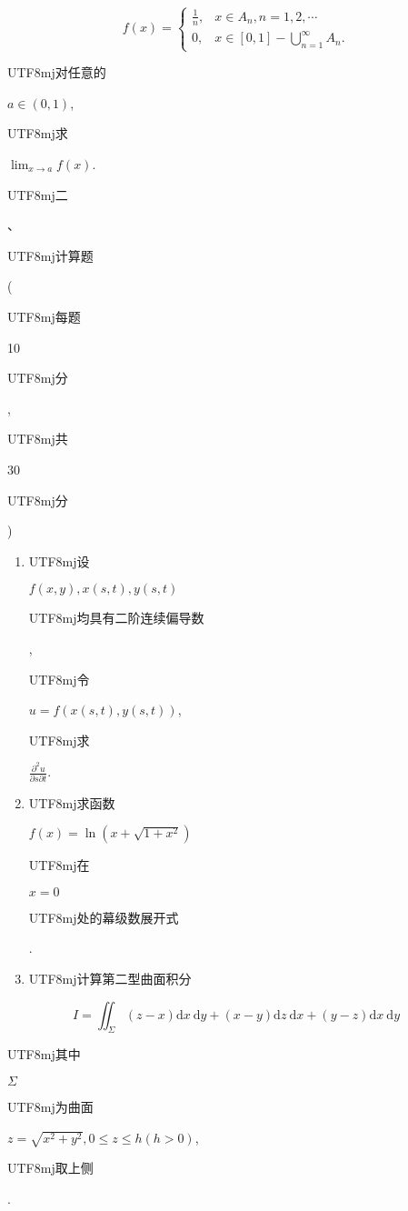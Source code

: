 \documentclass[10pt]{article}
\begin{document}
$$
f(x)= \begin{cases}\frac{1}{n}, & x \in A_{n}, n=1,2, \cdots \\ 0, & x \in[0,1]-\bigcup_{n=1}^{\infty} A_{n} .\end{cases}
$$
\begin{CJK}{UTF8}{mj}对任意的\end{CJK} $a \in(0,1)$, \begin{CJK}{UTF8}{mj}求\end{CJK} $\lim _{x \rightarrow a} f(x)$.

\begin{CJK}{UTF8}{mj}二\end{CJK}、\begin{CJK}{UTF8}{mj}计算题\end{CJK} (\begin{CJK}{UTF8}{mj}每题\end{CJK} 10 \begin{CJK}{UTF8}{mj}分\end{CJK}, \begin{CJK}{UTF8}{mj}共\end{CJK} 30 \begin{CJK}{UTF8}{mj}分\end{CJK})

\begin{enumerate}
  \item \begin{CJK}{UTF8}{mj}设\end{CJK} $f(x, y), x(s, t), y(s, t)$ \begin{CJK}{UTF8}{mj}均具有二阶连续偏导数\end{CJK}, \begin{CJK}{UTF8}{mj}令\end{CJK} $u=f(x(s, t), y(s, t))$, \begin{CJK}{UTF8}{mj}求\end{CJK} $\frac{\partial^{2} u}{\partial s \partial t}$.

  \item \begin{CJK}{UTF8}{mj}求函数\end{CJK} $f(x)=\ln \left(x+\sqrt{1+x^{2}}\right)$ \begin{CJK}{UTF8}{mj}在\end{CJK} $x=0$ \begin{CJK}{UTF8}{mj}处的幕级数展开式\end{CJK}.

  \item \begin{CJK}{UTF8}{mj}计算第二型曲面积分\end{CJK}

\end{enumerate}
$$
I=\iint_{\Sigma}(z-x) \mathrm{d} x \mathrm{~d} y+(x-y) \mathrm{d} z \mathrm{~d} x+(y-z) \mathrm{d} x \mathrm{~d} y
$$
\begin{CJK}{UTF8}{mj}其中\end{CJK} $\Sigma$ \begin{CJK}{UTF8}{mj}为曲面\end{CJK} $z=\sqrt{x^{2}+y^{2}}, 0 \leq z \leq h(h>0)$, \begin{CJK}{UTF8}{mj}取上侧\end{CJK}.
\end{document}
